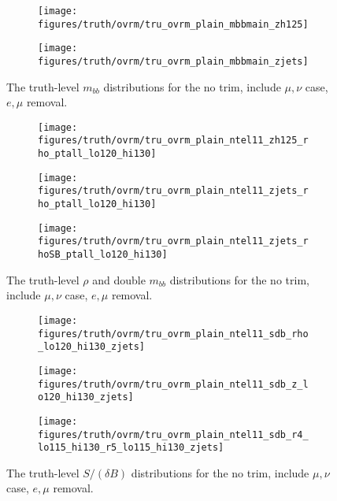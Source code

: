 \begin{figure}[!htbp]\captionsetup{justification=centering}
\begin{center}
\begin{subfigure}[t]{18pc}\centering\texttt{[image: figures/truth/ovrm/tru\_ovrm\_plain\_mbbmain\_zh125]}\caption{}\end{subfigure}
\begin{subfigure}[t]{18pc}\centering\texttt{[image: figures/truth/ovrm/tru\_ovrm\_plain\_mbbmain\_zjets]}\caption{}\end{subfigure}
\caption{\label{fig:mbbplain}The truth-level $m_{bb}$ distributions for the no trim, include $\mu,\nu$ case, $e,\mu$ removal.}
\end{center}
\end{figure}
\begin{figure}[!htbp]\captionsetup{justification=centering}
\begin{center}
\begin{subfigure}[t]{18pc}\centering\texttt{[image: figures/truth/ovrm/tru\_ovrm\_plain\_ntel11\_zh125\_rho\_ptall\_lo120\_hi130]}\caption{}\end{subfigure}
\begin{subfigure}[t]{18pc}\centering\texttt{[image: figures/truth/ovrm/tru\_ovrm\_plain\_ntel11\_zjets\_rho\_ptall\_lo120\_hi130]}\caption{}\end{subfigure}
\begin{subfigure}[t]{18pc}\centering\texttt{[image: figures/truth/ovrm/tru\_ovrm\_plain\_ntel11\_zjets\_rhoSB\_ptall\_lo120\_hi130]}\caption{}\end{subfigure}
\caption{\label{fig:mbbplain}The truth-level $\rho$ and double $m_{bb}$ distributions for the no trim, include $\mu,\nu$ case, $e,\mu$ removal.}
\end{center}
\end{figure}
\begin{figure}[!htbp]\captionsetup{justification=centering}
\begin{center}
\begin{subfigure}[t]{18pc}\centering\texttt{[image: figures/truth/ovrm/tru\_ovrm\_plain\_ntel11\_sdb\_rho\_lo120\_hi130\_zjets]}\caption{}\end{subfigure}
\begin{subfigure}[t]{18pc}\centering\texttt{[image: figures/truth/ovrm/tru\_ovrm\_plain\_ntel11\_sdb\_z\_lo120\_hi130\_zjets]}\caption{}\end{subfigure}
\begin{subfigure}[t]{18pc}\centering\texttt{[image: figures/truth/ovrm/tru\_ovrm\_plain\_ntel11\_sdb\_r4\_lo115\_hi130\_r5\_lo115\_hi130\_zjets]}\caption{}\end{subfigure}
\caption{\label{fig:mbbplain}The truth-level $S/(\delta B)$ distributions for the no trim, include $\mu,\nu$ case, $e,\mu$ removal.}
\end{center}
\end{figure}

